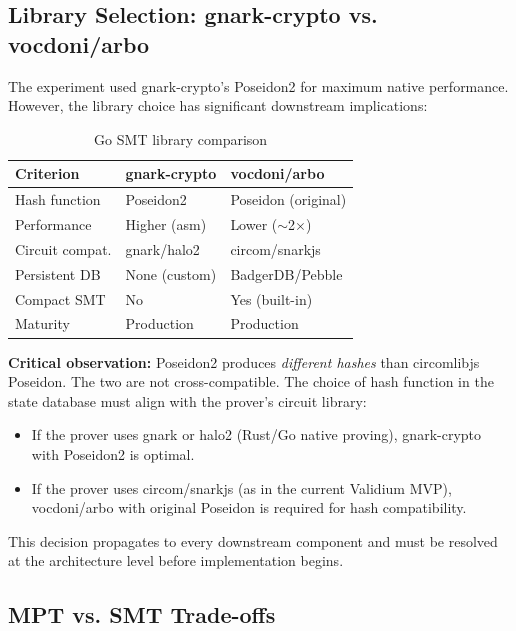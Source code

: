 \subsection{Library Selection: gnark-crypto vs. vocdoni/arbo}

The experiment used gnark-crypto's Poseidon2 for maximum native
performance. However, the library choice has significant downstream
implications:

\begin{table}[h]
\centering
\caption{Go SMT library comparison}
\label{tab:libraries}
\begin{tabular}{lll}
\toprule
\textbf{Criterion} & \textbf{gnark-crypto} & \textbf{vocdoni/arbo} \\
\midrule
Hash function   & Poseidon2        & Poseidon (original) \\
Performance     & Higher (asm)     & Lower ($\sim$2$\times$) \\
Circuit compat. & gnark/halo2      & circom/snarkjs \\
Persistent DB   & None (custom)    & BadgerDB/Pebble \\
Compact SMT     & No               & Yes (built-in) \\
Maturity        & Production       & Production \\
\bottomrule
\end{tabular}
\end{table}

\textbf{Critical observation:} Poseidon2 produces \textit{different
hashes} than circomlibjs Poseidon. The two are not cross-compatible.
The choice of hash function in the state database must align with the
prover's circuit library:
\begin{itemize}
  \item If the prover uses gnark or halo2 (Rust/Go native proving),
    gnark-crypto with Poseidon2 is optimal.
  \item If the prover uses circom/snarkjs (as in the current Validium
    MVP), vocdoni/arbo with original Poseidon is required for
    hash compatibility.
\end{itemize}

This decision propagates to every downstream component and must be
resolved at the architecture level before implementation begins.

\subsection{MPT vs. SMT Trade-offs}

